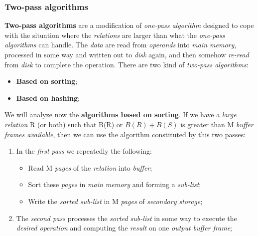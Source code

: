 \documentclass{article}
\begin{document}
\subsubsection{Two-pass algorithms}
\textbf{Two-pass algorithms} are a modification of \emph{one-pass algorithm} designed to cope with the situation where the \emph{relations} are larger than what the\emph{ one-pass algorithms} can handle. The \emph{data} are read from \emph{operands} into \emph{main memory}, processed in some way and written out to \emph{disk} again, and then somehow \emph{re-read} from \emph{disk} to complete the operation. There are two kind of \emph{two-pass algorithms}:
\begin{itemize}
\item \textbf{Based on sorting};
\item \textbf{Based on hashing};
\end{itemize}
We will analyze now the \textbf{algorithms based on sorting}. If we have a \emph{large relation} R (or both) such that B(R) or $B(R)+B(S)$ is greater than M \emph{buffer frames available}, then we can use the algorithm constituted by this two passes:
\begin{enumerate}
\item In the \emph{first pass} we repeatedly the following:
\begin{itemize}
\item Read M \emph{pages} of the \emph{relation} into \emph{buffer};
\item Sort these \emph{pages} in \emph{main memory} and forming a \emph{sub-list};
\item Write the \emph{sorted sub-list} in M \emph{pages} of \emph{secondary storage};
\end{itemize}
\item The \emph{second pass} processes the \emph{sorted sub-list} in some way to execute the \emph{desired operation} and computing the \emph{result} on one \emph{output buffer frame};
\end{enumerate}
\end{document}
